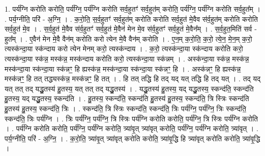 \documentclass[17pt]{extarticle}
\begin{document}
1. पर्य॑ग्नि करोति करोति॒ पर्य॑ग्नि॒ पर्य॑ग्नि करोति सर्व॒हुतꣳ॑ सर्व॒हुत॑म् करोति॒ पर्य॑ग्नि॒ पर्य॑ग्नि करोति सर्व॒हुत᳚म् । . पर्य॒ग्नीति॒ परि॑ - अ॒ग्नि॒ । . क॒रो॒ति॒ स॒र्व॒हुतꣳ॑ सर्व॒हुत॑म् करोति करोति सर्व॒हुत॑ मे॒वैव स॑र्व॒हुत॑म् करोति करोति सर्व॒हुत॑ मे॒व । . स॒र्व॒हुत॑ मे॒वैव स॑र्व॒हुतꣳ॑ सर्व॒हुत॑ मे॒वैन॑ मेन मे॒व स॑र्व॒हुतꣳ॑ सर्व॒हुत॑ मे॒वैन᳚म् । . स॒र्व॒हुत॒मिति॑ सर्व - हुत᳚म् । . ए॒वैन॑ मेन मे॒वै वैन॑म् करोति करो त्येन मे॒वै वैन॑म् करोति । . ए॒न॒म् क॒रो॒ति॒ क॒रो॒ त्ये॒न॒ मे॒न॒म् क॒रो॒ त्यस्क॑न्दा॒या स्क॑न्दाय करो त्येन मेनम् करो॒ त्यस्क॑न्दाय । . क॒रो॒ त्यस्क॑न्दा॒या स्क॑न्दाय करोति करो॒ त्यस्क॑न्दा॒या स्क॑न्न॒ मस्क॑न्न॒ मस्क॑न्दाय करोति करो॒ त्यस्क॑न्दा॒या स्क॑न्नम् । . अस्क॑न्दा॒या स्क॑न्न॒ मस्क॑न्न॒ मस्क॑न्दा॒या स्क॑न्दा॒या स्क॑न्नꣳ॒॒ हि ह्यस्क॑न्न॒ मस्क॑न्दा॒या स्क॑न्दा॒या स्क॑न्नꣳ॒॒ हि । . अस्क॑न्नꣳ॒॒ हि ह्यस्क॑न्न॒ मस्क॑न्नꣳ॒॒ हि तत् तद्ध्यस्क॑न्न॒ मस्क॑न्नꣳ॒॒ हि तत् । . हि तत् तद्धि हि तद् यद् यत् तद्धि हि तद् यत् । . तद् यद् यत् तत् तद् यद्धु॒तस्य॑ हु॒तस्य॒ यत् तत् तद् यद्धु॒तस्य॑ । . यद्धु॒तस्य॑ हु॒तस्य॒ यद् यद्धु॒तस्य॒ स्कन्द॑ति॒ स्कन्द॑ति हु॒तस्य॒ यद् यद्धु॒तस्य॒ स्कन्द॑ति । . हु॒तस्य॒ स्कन्द॑ति॒ स्कन्द॑ति हु॒तस्य॑ हु॒तस्य॒ स्कन्द॑ति॒ त्रि स्त्रिः स्कन्द॑ति हु॒तस्य॑ हु॒तस्य॒ स्कन्द॑ति॒ त्रिः । . स्कन्द॑ति॒ त्रि स्त्रिः स्कन्द॑ति॒ स्कन्द॑ति॒ त्रिः पर्य॑ग्नि॒ पर्य॑ग्नि॒ त्रिः स्कन्द॑ति॒ स्कन्द॑ति॒ त्रिः पर्य॑ग्नि । . त्रिः पर्य॑ग्नि॒ पर्य॑ग्नि॒ त्रि स्त्रिः पर्य॑ग्नि करोति करोति॒ पर्य॑ग्नि॒ त्रि स्त्रिः पर्य॑ग्नि करोति । . पर्य॑ग्नि करोति करोति॒ पर्य॑ग्नि॒ पर्य॑ग्नि करोति॒ त्र्या॑वृ॒त् त्र्या॑वृत् करोति॒ पर्य॑ग्नि॒ पर्य॑ग्नि करोति॒ त्र्या॑वृत् । . पर्य॒ग्नीति॒ परि॑ - अ॒ग्नि॒ । . क॒रो॒ति॒ त्र्या॑वृ॒त् त्र्या॑वृत् करोति करोति॒ त्र्या॑वृ॒द्धि हि त्र्या॑वृत् करोति करोति॒ त्र्या॑वृ॒द्धि । \newline
\end{document}
